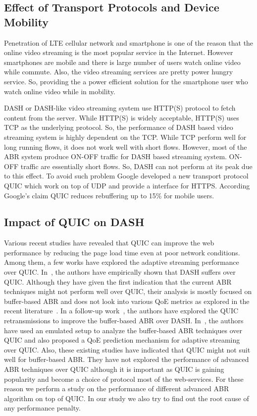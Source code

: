 \subsection{Effect of Transport Protocols and Device Mobility}
Penetration of LTE cellular network and smartphone is one of the reason that the online video streaming is the most popular service in the Internet. However smartphones are mobile and there is large number of users watch online video while commute. Also, the video streaming services are pretty power hungry service. So, providing the a power efficient solution for the smartphone user who watch online video while in mobility.

DASH or DASH-like video streaming system use HTTP(S) protocol to fetch content from the server. While HTTP(S) is widely acceptable, HTTP(S) uses TCP as the underlying protocol. So, the performance of DASH based video streaming system is highly dependent on the TCP. While TCP perform well for long running flows, it does not work well with short flows. However, most of the ABR system produce ON-OFF traffic for DASH based streaming system. ON-OFF traffic are essentially short flows. So, DASH can not perform at its peak due to this effect. To avoid such problem Google developed a new transport protocol QUIC\cite{langley2017quic} which work on top of UDP and provide a interface for HTTPS. According Google's claim QUIC reduces rebuffering up to 15\% for mobile users.

\subsection{Impact of QUIC on DASH}
Various recent studies \cite{Biswal2017,Megyesi2016} have revealed that QUIC can improve the web performance by reducing the page load time even at poor network conditions. Among them, a few works have explored the adaptive streaming performance over QUIC. In~\cite{bhat2017not}, the authors have empirically shown that DASH suffers over QUIC. Although they have given the first indication that the current ABR techniques might not perform well over QUIC, their analysis is mostly focused on buffer-based ABR and does not look into various QoE metrics as explored in the recent literature~\cite{yin2015control,mao2017neural}. In a follow-up work~\cite{bhat2018improving}, the authors have explored the QUIC retransmissions to improve the buffer-based ABR over DASH. In~\cite{van2018empirical}, the authors have used an emulated setup to analyze the buffer-based ABR techniques over QUIC and also proposed a QoE prediction mechanism for adaptive streaming over QUIC. Also, these existing studies have indicated that QUIC might not suit well for buffer-based ABR. They have not explored the performance of advanced ABR techniques over QUIC although it is important as QUIC is gaining popularity and become a choice of protocol most of the web-services. For these reason we perform a study on the performance of different advanced ABR algorithm on top of QUIC. In our study we also try to find out the root cause of any performance penalty.

